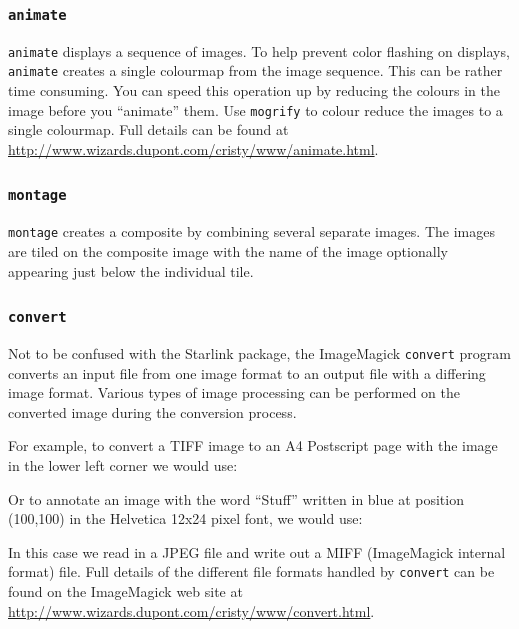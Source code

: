 \documentclass[twoside,11pt]{starlink}
\begin{document}
\subsubsection{\texttt{animate}}

\texttt{animate} displays a sequence of images. To help prevent color
flashing on  displays, \texttt{animate} creates a single colourmap from the image sequence. This can
be rather time consuming. You can speed this operation up by reducing
the colours in the image before you ``animate'' them. Use \texttt{mogrify} to colour reduce the images to a single colourmap. Full
details can be found at \url{http://www.wizards.dupont.com/cristy/www/animate.html}.

\subsubsection{\texttt{montage}}

\texttt{montage} creates a composite by combining several separate
images. The images are tiled on the composite image with the name of
the image optionally appearing just below the individual tile.

\subsubsection{\texttt{convert}}

Not to be confused with the Starlink  package,
the ImageMagick \texttt{convert} program converts an input file from one
image format to an output file with a differing image format. Various
types of image processing can be performed on the converted image
during the conversion process.

For example, to convert a TIFF image to an A4 Postscript page with the
image in the lower left corner we would use:

\begin{terminalv}
\end{terminalv}

Or to annotate an image with the word ``Stuff'' written in blue at position (100,100) in the Helvetica 12x24 pixel font, we would use:

\begin{terminalv}
\end{terminalv}

In this case we read in a JPEG file and write out a MIFF (ImageMagick
internal format) file. Full details of the different file formats
handled by \texttt{convert} can be found on the ImageMagick web site at
\url{http://www.wizards.dupont.com/cristy/www/convert.html}.
\end{document}
